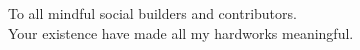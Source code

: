 \begin{dedication}
  To all mindful social builders and contributors.\\ 
  \vspace{1em}
  Your existence have made all my hardworks meaningful. 
\end{dedication}
